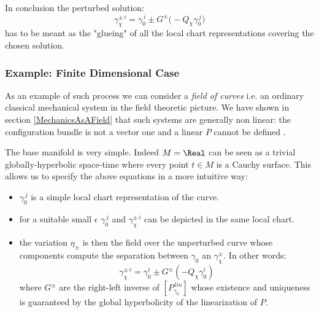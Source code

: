 \documentclass[Main]{subfiles}
\begin{document}
		In conclusion the perturbed solution:
		\begin{displaymath}
			\gamma_{\chi}^{\pm\,i} = \gamma_0^{\, i} \pm G^\pm \big( -Q_\chi \gamma_0^{\,j}\big)
		\end{displaymath}
		has to be meant as the "glueing" of all the local chart representations covering the chosen solution.

	\subsubsection{Example: Finite Dimensional Case} 
		As an example of such process we can consider a \emph{field of curves} i.e. an ordinary classical mechanical system in the field theoretic picture.
		We have shown in section \ref{MechanicsAsAField} that such systems are generally non linear: the configuration bundle is not a vector one and %
		a linear $P$ cannot be defined .
			
		The base manifold is very simple. Indeed $M= \Real$ can be seen as a trivial globally-hyperbolic space-time where every point $t\in M$ is a Cauchy surface.
		This allows us to specify the above equations in a more intuitive way:
		\begin{itemize}
			\item $\gamma_0^{\, j}$ is a simple local chart representation of the curve.
			\item for a suitable small $\epsilon$  $\gamma_0^{\, j}$ and $\gamma_{\chi}^{\pm\,i} $ can be depicted in the same local chart.
			\item the variation $\eta_\pm$ is then the field over the unperturbed curve whose components compute the separation between $\gamma_0$ an $\gamma_{\chi}^{\pm} $. In other words:
			\begin{displaymath}
				\gamma_{\chi}^{\pm \, i} = \gamma_0^i  \pm G^\pm (-Q_\chi \gamma_0^i)
			\end{displaymath}
			where $G^\pm$ are the right-left inverse of $\left[P_{\gamma_0}^{\, lin} \right]$ whose existence and uniqueness is guaranteed by the global hyperbolicity of the linearization of $P$.
		\end{itemize}
		
\end{document}
